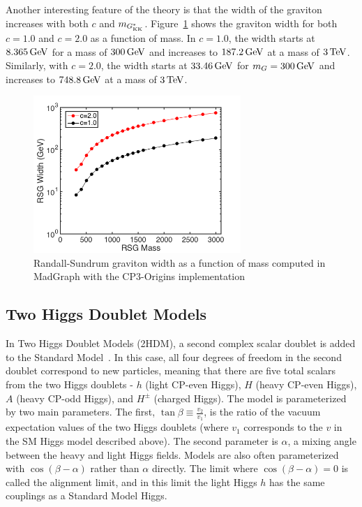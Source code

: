 Another interesting feature of the theory is that the width of the graviton increases with both $c$ and $m_{G^*_{\rm KK}}$. Figure~\ref{fig:G_width} shows the graviton width for both $c=1.0$ and $c=2.0$ as a function of mass. In $c=1.0$, the width starts at $8.365 \GeV$ for a mass of $300 \GeV$ and increases to $187.2 \GeV$ at a mass of $3 \TeV$. Similarly, with $c=2.0$, the width starts at $33.46 \GeV$ for $m_G = 300 \GeV$ and increases to $748.8 \GeV$ at a mass of $3 \TeV$. 

\begin{figure}[h!]
  \centering
  \captionsetup{justification=centering}

  \includegraphics[width=0.7\textwidth]{figures/RSG_width}
   \caption{Randall-Sundrum graviton width as a function of mass computed in MadGraph with the CP3-Origins implementation~\cite{RSG_LHC,MadGraph,CP3Origins}}
  \label{fig:G_width}
\end{figure}

\subsection{Two Higgs Doublet Models}

In Two Higgs Doublet Models (2HDM), a second complex scalar doublet is added to the Standard Model~\cite{HH_2HDM,2HDM2,2HDM3}. In this case, all four degrees of freedom in the second doublet correspond to new particles, meaning that there are five total scalars from the two Higgs doublets - $h$ (light CP-even Higgs), $H$ (heavy CP-even Higgs), $A$ (heavy CP-odd Higgs), and $H^{\pm}$ (charged Higgs). The model is parameterized by two main parameters. The first, $\tan{\beta} \equiv \frac{v_2}{v_1}$, is the ratio of the vacuum expectation values of the two Higgs doublets (where $v_1$ corresponds to the $v$ in the SM Higgs model described above). The second parameter is $\alpha$, a mixing angle between the heavy and light Higgs fields. Models are also often parameterized with $\cos(\beta - \alpha)$ rather than $\alpha$ directly. The limit where $\cos(\beta - \alpha) = 0$ is called the alignment limit, and in this limit the light Higgs $h$ has the same couplings as a Standard Model Higgs. 

